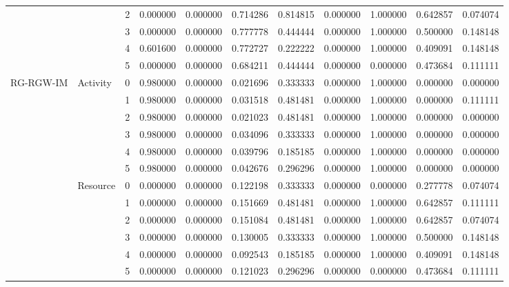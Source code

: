\begin{tabular}{lllrrrrrrrr}
 &  & 2 & 0.000000 & 0.000000 & 0.714286 & 0.814815 & 0.000000 & 1.000000 & 0.642857 & 0.074074 \\
 &  & 3 & 0.000000 & 0.000000 & 0.777778 & 0.444444 & 0.000000 & 1.000000 & 0.500000 & 0.148148 \\
 &  & 4 & 0.601600 & 0.000000 & 0.772727 & 0.222222 & 0.000000 & 1.000000 & 0.409091 & 0.148148 \\
 &  & 5 & 0.000000 & 0.000000 & 0.684211 & 0.444444 & 0.000000 & 0.000000 & 0.473684 & 0.111111 \\
\cline{1-11} \cline{2-11}
\multirow[t]{12}{*}{RG-RGW-IM} & \multirow[t]{6}{*}{Activity} & 0 & 0.980000 & 0.000000 & 0.021696 & 0.333333 & 0.000000 & 1.000000 & 0.000000 & 0.000000 \\
 &  & 1 & 0.980000 & 0.000000 & 0.031518 & 0.481481 & 0.000000 & 1.000000 & 0.000000 & 0.111111 \\
 &  & 2 & 0.980000 & 0.000000 & 0.021023 & 0.481481 & 0.000000 & 1.000000 & 0.000000 & 0.000000 \\
 &  & 3 & 0.980000 & 0.000000 & 0.034096 & 0.333333 & 0.000000 & 1.000000 & 0.000000 & 0.000000 \\
 &  & 4 & 0.980000 & 0.000000 & 0.039796 & 0.185185 & 0.000000 & 1.000000 & 0.000000 & 0.000000 \\
 &  & 5 & 0.980000 & 0.000000 & 0.042676 & 0.296296 & 0.000000 & 1.000000 & 0.000000 & 0.000000 \\
\cline{2-11}
 & \multirow[t]{6}{*}{Resource} & 0 & 0.000000 & 0.000000 & 0.122198 & 0.333333 & 0.000000 & 0.000000 & 0.277778 & 0.074074 \\
 &  & 1 & 0.000000 & 0.000000 & 0.151669 & 0.481481 & 0.000000 & 1.000000 & 0.642857 & 0.111111 \\
 &  & 2 & 0.000000 & 0.000000 & 0.151084 & 0.481481 & 0.000000 & 1.000000 & 0.642857 & 0.074074 \\
 &  & 3 & 0.000000 & 0.000000 & 0.130005 & 0.333333 & 0.000000 & 1.000000 & 0.500000 & 0.148148 \\
 &  & 4 & 0.000000 & 0.000000 & 0.092543 & 0.185185 & 0.000000 & 1.000000 & 0.409091 & 0.148148 \\
 &  & 5 & 0.000000 & 0.000000 & 0.121023 & 0.296296 & 0.000000 & 0.000000 & 0.473684 & 0.111111 \\
\cline{1-11} \cline{2-11}
\bottomrule
\end{tabular}
